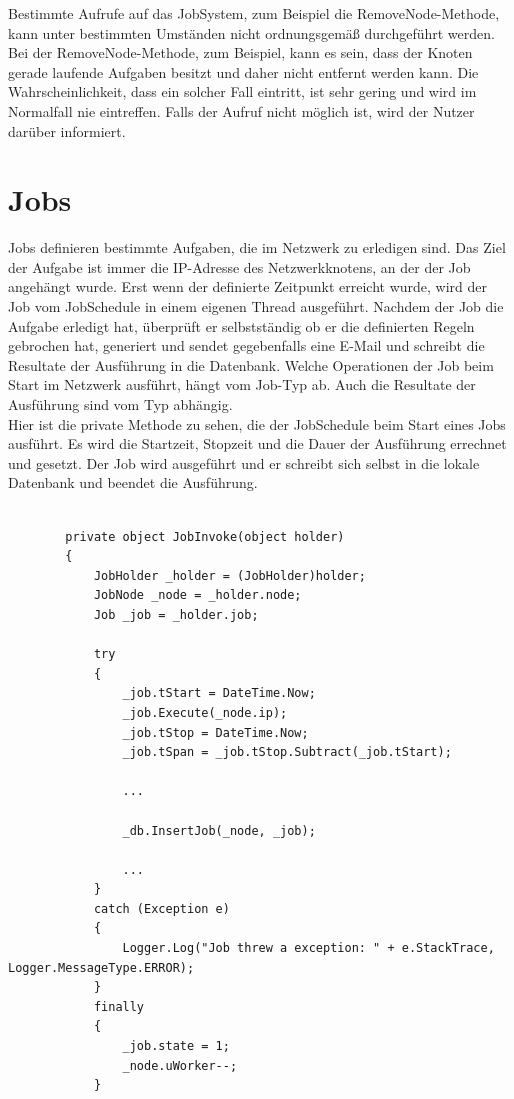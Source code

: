 \documentclass[12pt,a4paper]{report}
\begin{document}
\begin{onehalfspace}
Bestimmte Aufrufe auf das JobSystem, zum Beispiel die RemoveNode-Methode, kann unter bestimmten Umständen nicht ordnungsgemäß durchgeführt werden. Bei der RemoveNode-Methode, zum Beispiel, kann es sein, dass der Knoten gerade laufende Aufgaben besitzt und daher nicht entfernt werden kann. Die Wahrscheinlichkeit, dass ein solcher Fall eintritt, ist sehr gering und wird im Normalfall nie eintreffen. Falls der Aufruf nicht möglich ist, wird der Nutzer darüber informiert.

\chapter{Jobs}

Jobs definieren bestimmte Aufgaben, die im Netzwerk zu erledigen sind. Das Ziel der Aufgabe ist immer die IP-Adresse des Netzwerkknotens, an der der Job angehängt wurde. Erst wenn der definierte Zeitpunkt erreicht wurde, wird der Job vom JobSchedule in einem eigenen Thread ausgeführt. Nachdem der Job die Aufgabe erledigt hat, überprüft er selbstständig ob er die definierten Regeln gebrochen hat, generiert und sendet gegebenfalls eine E-Mail und schreibt die Resultate der Ausführung in die Datenbank. Welche Operationen der Job beim Start im Netzwerk ausführt, hängt vom Job-Typ ab. Auch die Resultate der Ausführung sind vom Typ abhängig.\\

Hier ist die private Methode zu sehen, die der JobSchedule beim Start eines Jobs ausführt. Es wird die Startzeit, Stopzeit und die Dauer der Ausführung errechnet und gesetzt. Der Job wird ausgeführt und er schreibt sich selbst in die lokale Datenbank und beendet die Ausführung.

\begin{lstlisting}
  
        private object JobInvoke(object holder)
        {
            JobHolder _holder = (JobHolder)holder;
            JobNode _node = _holder.node;
            Job _job = _holder.job;

            try
            {
                _job.tStart = DateTime.Now;
                _job.Execute(_node.ip);
                _job.tStop = DateTime.Now;
                _job.tSpan = _job.tStop.Subtract(_job.tStart);

              	...

                _db.InsertJob(_node, _job);

              	...
            }
            catch (Exception e)
            {
                Logger.Log("Job threw a exception: " + e.StackTrace, Logger.MessageType.ERROR);
            }
            finally
            {
                _job.state = 1;
                _node.uWorker--;
            }


\end{lstlisting}
\end{onehalfspace}
\end{document}
